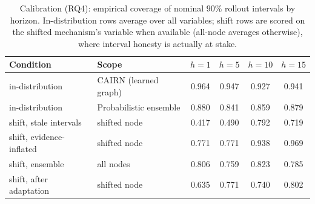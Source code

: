 \begin{table}[t]
\caption{Calibration (RQ4): empirical coverage of nominal $90\%$ rollout
intervals by horizon. In-distribution rows average over all variables;
shift rows are scored on the shifted mechanism's variable when available
(all-node averages otherwise), where interval honesty is actually at
stake.}\label{tab:rq4}
\footnotesize\setlength{\tabcolsep}{4pt}%
\begin{tabular}{llcccc}
\toprule
Condition & Scope & $h{=}1$ & $h{=}5$ & $h{=}10$ & $h{=}15$\\
\midrule
in-distribution & CAIRN (learned graph) & 0.964 & 0.947 & 0.927 & 0.941 \\
in-distribution & Probabilistic ensemble & 0.880 & 0.841 & 0.859 & 0.879 \\
\midrule
shift, stale intervals & shifted node & 0.417 & 0.490 & 0.792 & 0.719 \\
shift, evidence-inflated & shifted node & 0.771 & 0.771 & 0.938 & 0.969 \\
shift, ensemble & all nodes & 0.806 & 0.759 & 0.823 & 0.785 \\
shift, after adaptation & shifted node & 0.635 & 0.771 & 0.740 & 0.802 \\
\bottomrule
\end{tabular}
\end{table}
